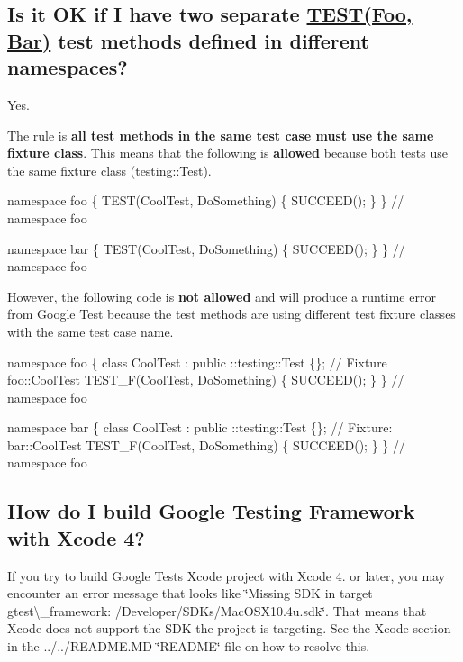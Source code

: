 \subsection*{Is it OK if I have two separate {\ttfamily \hyperlink{gtest_8h_ad8b332753515c0ab8baada563c2547eb}{T\+E\+S\+T(\+Foo, Bar)}} test methods defined in different namespaces?}

Yes.

The rule is {\bfseries all test methods in the same test case must use the same fixture class}. This means that the following is {\bfseries allowed} because both tests use the same fixture class ({\ttfamily \hyperlink{classtesting_1_1_test}{testing\+::\+Test}}).


\begin{DoxyCode}
namespace foo \{
TEST(CoolTest, DoSomething) \{
  SUCCEED();
\}
\}  // namespace foo

namespace bar \{
TEST(CoolTest, DoSomething) \{
  SUCCEED();
\}
\}  // namespace foo
\end{DoxyCode}


However, the following code is {\bfseries not allowed} and will produce a runtime error from Google Test because the test methods are using different test fixture classes with the same test case name.


\begin{DoxyCode}
namespace foo \{
class CoolTest : public ::testing::Test \{\};  // Fixture foo::CoolTest
TEST\_F(CoolTest, DoSomething) \{
  SUCCEED();
\}
\}  // namespace foo

namespace bar \{
class CoolTest : public ::testing::Test \{\};  // Fixture: bar::CoolTest
TEST\_F(CoolTest, DoSomething) \{
  SUCCEED();
\}
\}  // namespace foo
\end{DoxyCode}


\subsection*{How do I build Google Testing Framework with Xcode 4?}

If you try to build Google Test\textquotesingle{}s Xcode project with Xcode 4. or later, you may encounter an error message that looks like \char`\"{}\+Missing S\+D\+K in target gtest\textbackslash{}\+\_\+framework\+: /\+Developer/\+S\+D\+Ks/\+Mac\+O\+S\+X10.\+4u.\+sdk\char`\"{}. That means that Xcode does not support the S\+DK the project is targeting. See the Xcode section in the ../../\+R\+E\+A\+D\+ME.MD \char`\"{}\+R\+E\+A\+D\+M\+E\char`\"{} file on how to resolve this.

